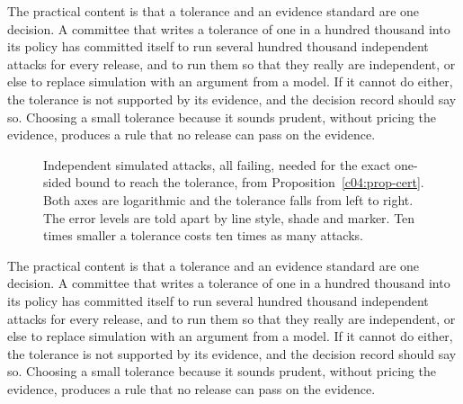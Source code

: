 The practical content is that a tolerance and an evidence standard are one decision. A
committee that writes a tolerance of one in a hundred thousand into its policy has
committed itself to run several hundred thousand independent attacks for every release,
and to run them so that they really are independent, or else to replace simulation with
an argument from a model. If it cannot do either, the tolerance is not supported by its
evidence, and the decision record should say so. Choosing a small tolerance because it
sounds prudent, without pricing the evidence, produces a rule that no release can pass
on the evidence.

\begin{figure}[t]
\centering
\caption{Independent simulated attacks, all failing, needed for the exact one-sided bound
to reach the tolerance, from Proposition~\ref{c04:prop-cert}. Both axes are logarithmic
and the tolerance falls from left to right. The error levels are told apart by line
style, shade and marker. Ten times smaller a tolerance costs ten times as many attacks.}
\label{c04:fig-cost}
\end{figure}

The practical content is that a tolerance and an evidence standard are one decision. A
committee that writes a tolerance of one in a hundred thousand into its policy has
committed itself to run several hundred thousand independent attacks for every release,
and to run them so that they really are independent, or else to replace simulation with
an argument from a model. If it cannot do either, the tolerance is not supported by its
evidence, and the decision record should say so. Choosing a small tolerance because it
sounds prudent, without pricing the evidence, produces a rule that no release can pass
on the evidence.

